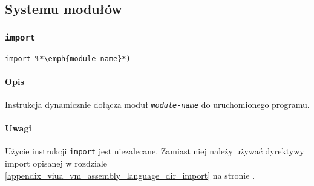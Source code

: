 \subsection{Systemu modułów}
\label{viua_vm_ops_module_system}

\subsubsection{\texttt{import}}

\begin{lstlisting}
import %*\emph{module-name}*)
\end{lstlisting}

\paragraph*{Opis} Instrukcja dynamicznie dołącza moduł
\texttt{\emph{module-name}} do uruchomionego programu.

\paragraph*{Uwagi}

Użycie instrukcji \texttt{import} jest niezalecane.
Zamiast niej należy używać dyrektywy import opisanej w rozdziale
\ref{appendix_viua_vm_assembly_language_dir_import} na stronie
\pageref{appendix_viua_vm_assembly_language_dir_import}.
